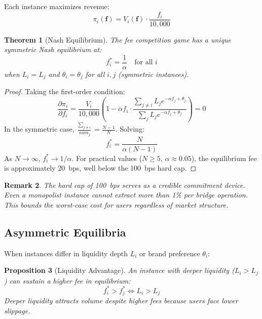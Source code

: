 \documentclass[11pt,twocolumn]{article}
\newtheorem{theorem}{Theorem}[section]
\newtheorem{proposition}[theorem]{Proposition}
\newtheorem{remark}[theorem]{Remark}
\theoremstyle{definition}
\begin{document}
Each instance maximizes revenue:
\begin{equation}
  \pi_i(\mathbf{f}) = V_i(\mathbf{f}) \cdot \frac{f_i}{10{,}000}
\end{equation}

\begin{theorem}[Nash Equilibrium]
\label{thm:nash}
The fee competition game has a unique symmetric Nash equilibrium at:
\begin{equation}
  f_i^* = \frac{1}{\alpha} \quad \text{for all } i
\end{equation}
when $L_i = L_j$ and $\theta_i = \theta_j$ for all $i, j$ (symmetric instances).
\end{theorem}

\begin{proof}
Taking the first-order condition:
\begin{equation}
  \frac{\partial \pi_i}{\partial f_i} = \frac{V_i}{10{,}000} \left(1 - \alpha f_i \cdot \frac{\sum_{j \neq i} L_j e^{-\alpha f_j + \theta_j}}{\sum_j L_j e^{-\alpha f_j + \theta_j}}\right) = 0
\end{equation}
In the symmetric case, $\frac{\sum_{j \neq i}}{sum_j} = \frac{N-1}{N}$. Solving:
\begin{equation}
  f_i^* = \frac{N}{\alpha(N-1)}
\end{equation}
As $N \to \infty$, $f_i^* \to 1/\alpha$. For practical values ($N \geq 5$, $\alpha \approx 0.05$), the equilibrium fee is approximately 20~bps, well below the 100~bps hard cap.
\end{proof}

\begin{remark}
The hard cap of 100~bps serves as a credible commitment device. Even a monopolist instance cannot extract more than 1\% per bridge operation. This bounds the worst-case cost for users regardless of market structure.
\end{remark}

\subsection{Asymmetric Equilibria}

When instances differ in liquidity depth $L_i$ or brand preference $\theta_i$:

\begin{proposition}[Liquidity Advantage]
\label{prop:liquidity}
An instance with deeper liquidity ($L_i > L_j$) can sustain a higher fee in equilibrium:
\begin{equation}
  f_i^* > f_j^* \iff L_i > L_j
\end{equation}
Deeper liquidity attracts volume despite higher fees because users face lower slippage.
\end{proposition}
\end{document}
